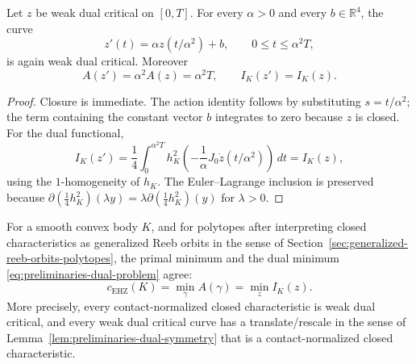 \begin{lemma}\label{lem:preliminaries-dual-symmetry}
Let \(z\) be weak dual critical on \([0,T]\). For every
\(\alpha>0\) and every \(b\in\mathbb{R}^4\), the curve
\[
  z'(t)=\alpha z(t/\alpha^2)+b,
  \qquad 0\leq t\leq \alpha^2T,
\]
is again weak dual critical. Moreover
\[
  A(z')=\alpha^2A(z)=\alpha^2T,
  \qquad
  I_K(z')=I_K(z).
\]
\end{lemma}

\begin{proof}
Closure is immediate. The action identity follows by substituting
\(s=t/\alpha^2\); the term containing the constant vector \(b\) integrates to
zero because \(z\) is closed. For the dual functional,
\[
  I_K(z')
  =\frac{1}{4}\int_0^{\alpha^2T}
    h_K^2\!\left(-\frac{1}{\alpha}J_0\dot{z}(t/\alpha^2)\right)\,dt
  =I_K(z),
\]
using the \(1\)-homogeneity of \(h_K\). The Euler--Lagrange inclusion is
preserved because
\(\partial(\frac14 h_K^2)(\lambda y)=\lambda
\partial(\frac14 h_K^2)(y)\) for \(\lambda>0\).
\end{proof}

\begin{theorem}\label{thm:preliminaries-clarke-dual-action}
For a smooth convex body \(K\), and for polytopes after interpreting closed
characteristics as generalized Reeb orbits in the sense of
Section~\ref{sec:generalized-reeb-orbits-polytopes}, the primal minimum and the
dual minimum \eqref{eq:preliminaries-dual-problem} agree:
\[
  c_{\mathrm{EHZ}}(K)
  = \min_\gamma A(\gamma)
  = \min_z I_K(z).
\]
More precisely, every contact-normalized closed characteristic is weak dual
critical, and every weak dual critical curve has a translate/rescale in the
sense of Lemma~\ref{lem:preliminaries-dual-symmetry} that is a
contact-normalized closed characteristic.
\end{theorem}

